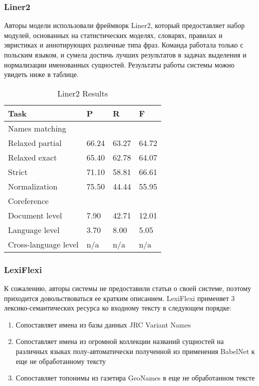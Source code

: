 \subsubsection{Liner2}

Авторы модели использовали фреймворк Liner2, который предоставляет набор модулей, основанных на статистических моделях, словарях, правилах и эвристиках и аннотирующих различные типа фраз. Команда работала только с польским языком, и сумела достичь лучших результатов в задачах выделения и нормализации именованных сущностей. Результаты работы системы можно увидеть ниже в таблице.

\begin{table}[ht]
\centering
\caption{Liner2 Results}
\label{liner2}
\begin{tabular}{|l|l|l|l|}
\hline
Task                 & P     & R     & F     \\ \hline
Names matching       &       &       &       \\ \hline
Relaxed partial      & 66.24 & 63.27 & 64.72 \\ \hline
Relaxed exact        & 65.40 & 62.78 & 64.07 \\ \hline
Strict               & 71.10 & 58.81 & 66.61 \\ \hline
Normalization        & 75.50 & 44.44 & 55.95 \\ \hline
Coreference          &       &       &       \\ \hline
Document level       & 7.90  & 42.71 & 12.01 \\ \hline
Language level       & 3.70  & 8.00  & 5.05  \\ \hline
Cross-language level & n/a   & n/a   & n/a   \\ \hline
\end{tabular}
\end{table}

\subsubsection{LexiFlexi}

К сожалению, авторы системы не предоставили статьи о своей системе, поэтому приходится довольствоваться ее кратким описанием. LexiFlexi применяет 3 лексико-семантических ресурса ко входному тексту в следующем порядке:

\begin{enumerate}
    \item Сопоставляет имена из базы данных JRC Variant Names 
    \item Сопоставляет имена из огромной коллекции названий сущностей на различных языках полу-автоматически полученной из применения BabelNet к еще не обработанному тексту
    \item Сопоставляет топонимы из газетира GeoNames в еще не обработанном тексте
\end{enumerate}

